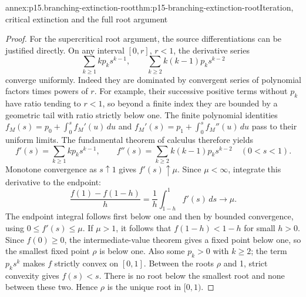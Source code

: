 \begin{annexitem}{annex:p15.branching-extinction-root}{thm:p15-branching-extinction-root}{Iteration, critical extinction and the full root argument}
\begin{proof}
For the supercritical root argument, the source differentiations
can be justified directly. On any interval \([0,r]\), \(r<1\),
the derivative series
\[
             \sum_{k\geq1}kp_ks^{k-1},\qquad
             \sum_{k\geq2}k(k-1)p_ks^{k-2}
\]
converge uniformly. Indeed they are dominated by convergent
series of polynomial factors times powers of \(r\).
For example, their successive positive terms without \(p_k\)
have ratio tending to \(r<1\), so beyond a finite index they
are bounded by a geometric tail with ratio strictly below one.
The finite polynomial identities
\(f_M(s)=p_0+\int_0^sf_M'(u)\,du\) and
\(f_M'(s)=p_1+\int_0^sf_M''(u)\,du\)
pass to their uniform limits. The fundamental theorem of
calculus therefore yields
\[
       f'(s)=\sum_{k\geq1}kp_ks^{k-1},\qquad
       f''(s)=\sum_{k\geq2}k(k-1)p_ks^{k-2}\quad(0<s<1).
\]
Monotone convergence as \(s\uparrow1\) gives \(f'(s)\uparrow\mu\).
Since \(\mu<\infty\), integrate this derivative to the endpoint:
\[
        \frac{f(1)-f(1-h)}h
                   =\frac1h\int_{1-h}^1 f'(s)\,ds\longrightarrow\mu.
\]
The endpoint integral follows first below one and then by bounded
convergence, using \(0\leq f'(s)\leq\mu\).
If \(\mu>1\), it follows that \(f(1-h)<1-h\) for small \(h>0\).
Since \(f(0)\geq0\), the intermediate-value theorem gives a fixed
point below one, so the smallest fixed point \(\rho\) is below one.
Also some \(p_k>0\) with \(k\geq2\); the term \(p_ks^k\)
makes \(f\) strictly convex on \([0,1]\).
Between the roots \(\rho\) and 1, strict convexity gives
\(f(s)<s\). There is no root below the smallest root and none
between these two. Hence \(\rho\) is the unique root in \([0,1)\).
\end{proof}
\end{annexitem}

